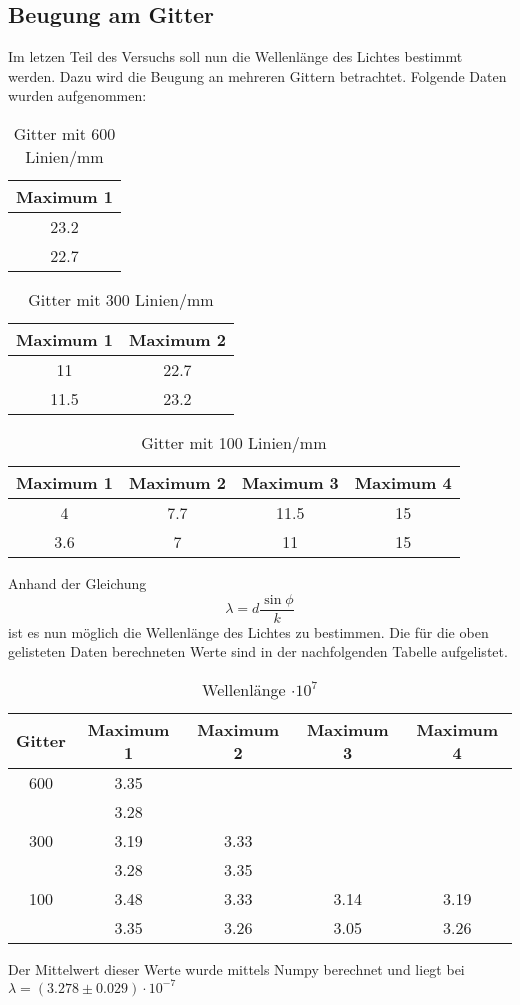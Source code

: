 \subsection{Beugung am Gitter}
  Im letzen Teil des Versuchs soll nun die Wellenlänge des Lichtes bestimmt werden. Dazu 
  wird die Beugung an mehreren Gittern betrachtet. Folgende Daten wurden aufgenommen:
  \begin{table}[H]
    \centering
    \caption{Gitter mit 600 Linien/mm}
    \begin{tabular}{c}
      \toprule
      Maximum 1\\
      \midrule
      23.2 \\
      22.7 \\
      \bottomrule
    \end{tabular}
  \end{table}
  \begin{table}[H]
    \centering
    \caption{Gitter mit 300 Linien/mm}
    \begin{tabular}{c c}
      \toprule
      Maximum 1 & Maximum 2\\
      \midrule
      11   & 22.7 \\
      11.5 & 23.2 \\
      \bottomrule
    \end{tabular}
  \end{table}
  \begin{table}[H]
    \centering
    \caption{Gitter mit 100 Linien/mm}
    \begin{tabular}{c c c c}
      \toprule
      Maximum 1 & Maximum 2 & Maximum 3 & Maximum 4\\
      \midrule
      4   & 7.7 & 11.5 & 15 \\
      3.6 & 7   & 11   & 15 \\
      \bottomrule
    \end{tabular}
  \end{table}
  \noindent Anhand der Gleichung 
  \begin{equation*}
    \lambda = d \dfrac{\sin{\phi}}{k}
  \end{equation*}
  ist es nun möglich die Wellenlänge des Lichtes zu bestimmen. Die für die oben 
  gelisteten Daten berechneten Werte sind in der nachfolgenden Tabelle aufgelistet.
  \begin{table}[H]
    \centering
    \caption{Wellenlänge $\cdot 10^{7}$}
    \begin{tabular}{c c c c c}
      \toprule
      Gitter & Maximum 1 & Maximum 2 & Maximum 3 & Maximum 4\\
      \midrule
      600&3.35   &&&\\
      &3.28&&&\\
      300&3.19& 3.33&& \\
      &3.28&3.35&&\\
      100&  3.48   &   3.33&  3.14&3.19 \\
      &3.35&3.26&3.05&3.26\\
      \bottomrule
    \end{tabular}
  \end{table}
  \noindent Der Mittelwert dieser Werte wurde mittels Numpy berechnet und liegt bei 
  $\lambda=(3.278\pm0.029)\cdot 10^{-7}$